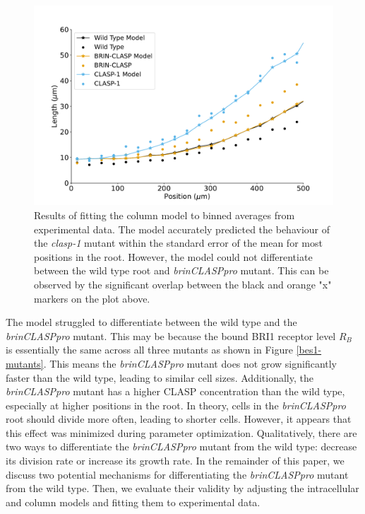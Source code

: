 \documentclass[referee,pdflatex,sn-mathphys-num]{sn-jnl}
\begin{document}
\begin{figure}
  \centering
  \includegraphics[width=\textwidth]{column-original-fit.pdf}
\caption{Results of fitting the column model to binned averages from experimental data.
The model accurately predicted the behaviour of the \emph{clasp-1} mutant within the standard error of the mean for most positions in the root.
However, the model could not differentiate between the wild type root and \emph{brinCLASPpro} mutant.
This can be observed by the significant overlap between the black and orange "x" markers on the plot above. }
\label{column-results}
\end{figure}

The model struggled to differentiate between the wild type and the \emph{brinCLASPpro} mutant.
This may be because the bound BRI1 receptor level $R_{B}$ is essentially the same across all three mutants as shown in Figure \ref{bes1-mutants}.
This means the \emph{brinCLASPpro} mutant does not grow significantly faster than the wild type, leading to similar cell sizes.
Additionally, the \emph{brinCLASPpro} mutant has a higher CLASP concentration than the wild type, especially at higher positions in the root.
In theory, cells in the \emph{brinCLASPpro} root should divide more often, leading to shorter cells.
However, it appears that this effect was minimized during parameter optimization.
Qualitatively, there are two ways to differentiate the \emph{brinCLASPpro} mutant from the wild type: decrease its division rate or increase its growth rate.
In the remainder of this paper, we discuss two potential mechanisms for differentiating the \emph{brinCLASPpro} mutant from the wild type.
Then, we evaluate their validity by adjusting the intracellular and column models and fitting them to experimental data.
\end{document}

